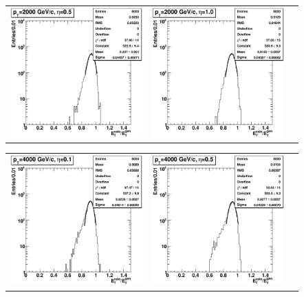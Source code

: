 \documentclass{cmspaper}
\begin{document}
\begin{appendices}
\begin{center}
\begin{tabular}{lll}
 \includegraphics[width=2in]{figs/h_ETRatio_ET_py_fit_corr_eta0.5_pT2000.eps} &
 \includegraphics[width=2in]{figs/h_ETRatio_ET_py_fit_corr_eta1.0_pT2000.eps} \\
\end{tabular}
\end{center}
\begin{center}
\begin{tabular}{lll}
 \includegraphics[width=2in]{figs/h_ETRatio_ET_py_fit_corr_eta0.1_pT4000.eps} &
 \includegraphics[width=2in]{figs/h_ETRatio_ET_py_fit_corr_eta0.5_pT4000.eps} &

\end{tabular}
\end{center}
\end{appendices}
\end{document}
